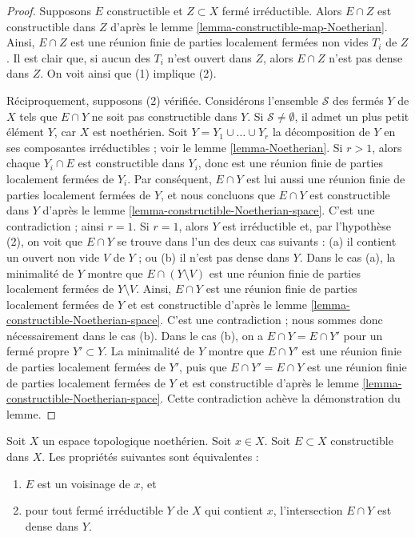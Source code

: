 \begin{proof}
Supposons $E$ constructible et $Z \subset X$ fermé irréductible.
Alors $E \cap Z$ est constructible dans $Z$ d'après le
lemme \ref{lemma-constructible-map-Noetherian}.
Ainsi, $E \cap Z$ est une réunion finie de parties localement fermées non
vides $T_i$ de $Z$. Il est clair que, si aucun des $T_i$ n'est ouvert dans
$Z$, alors $E \cap Z$ n'est pas dense dans $Z$. On voit ainsi que (1)
implique (2).

\medskip\noindent
Réciproquement, supposons (2) vérifiée. Considérons l'ensemble $\mathcal{S}$
des fermés $Y$ de $X$ tels que $E \cap Y$ ne soit pas constructible dans $Y$.
Si $\mathcal{S} \not = \emptyset$, il admet un plus petit élément $Y$, car
$X$ est noethérien.
Soit $Y = Y_1 \cup \ldots \cup Y_r$ la décomposition de $Y$ en ses
composantes irréductibles ; voir le lemme \ref{lemma-Noetherian}.
Si $r > 1$, alors chaque $Y_i \cap E$ est constructible dans $Y_i$, donc est
une réunion finie de parties localement fermées de $Y_i$. Par conséquent,
$E \cap Y$ est lui aussi une réunion finie de parties localement fermées de
$Y$, et nous concluons que $E \cap Y$ est constructible dans $Y$ d'après le
lemme \ref{lemma-constructible-Noetherian-space}.
C'est une contradiction ; ainsi $r = 1$. Si $r = 1$, alors $Y$ est
irréductible et, par l'hypothèse (2), on voit que $E \cap Y$ se trouve dans
l'un des deux cas suivants : (a) il contient un ouvert non vide $V$ de $Y$ ; ou
(b) il n'est pas dense dans $Y$.
Dans le cas (a), la minimalité de $Y$ montre que $E \cap (Y \setminus V)$
est une réunion finie de parties localement fermées de $Y \setminus V$.
Ainsi, $E \cap Y$ est une réunion finie de parties localement fermées de $Y$
et est constructible d'après le
lemme \ref{lemma-constructible-Noetherian-space}.
C'est une contradiction ; nous sommes donc nécessairement dans le cas (b).
Dans le cas (b), on a $E \cap Y = E \cap Y'$ pour un fermé propre
$Y' \subset Y$. La minimalité de $Y$ montre que $E \cap Y'$ est une réunion
finie de parties localement fermées de $Y'$, puis que
$E \cap Y' = E \cap Y$ est une réunion finie de parties localement fermées
de $Y$ et est constructible d'après le
lemme \ref{lemma-constructible-Noetherian-space}.
Cette contradiction achève la démonstration du lemme.
\end{proof}

\begin{lemma}
\label{lemma-constructible-neighbourhood-Noetherian}
Soit $X$ un espace topologique noethérien.
Soit $x \in X$.
Soit $E \subset X$ constructible dans $X$.
Les propriétés suivantes sont équivalentes :
\begin{enumerate}
\item $E$ est un voisinage de $x$, et
\item pour tout fermé irréductible $Y$ de $X$ qui contient $x$,
l'intersection $E \cap Y$ est dense dans $Y$.
\end{enumerate}
\end{lemma}

